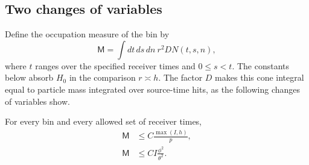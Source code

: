 \subsection{Two changes of variables}

Define the occupation measure of the bin by
\begin{equation}\label{occ:measure}
 \mathsf M=\int dt\,ds\,dn\ r^2 D N(t,s,n),
\end{equation}
where $t$ ranges over the specified receiver times and $0\leq s<t$.
The constants below absorb $H_0$ in the comparison $r\asymp h$.
The factor $D$ makes this cone integral equal to particle mass integrated
over source-time hits, as the following changes of variables show.

\begin{lemma}\label{occ:crude-lemma}
For every bin and every allowed set of receiver times,
\begin{align}
 \mathsf M&\leq C\frac{\max(I,h)}p,
                       \label{occ:energy}\\
 \mathsf M&\leq C I\frac{\phi^2}{\theta^2}.
                       \label{occ:time}
\end{align}
\end{lemma}

